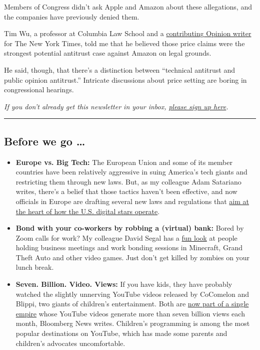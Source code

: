 Members of Congress didn't ask Apple and Amazon about these allegations,
and the companies have previously denied them.

Tim Wu, a professor at Columbia Law School and a
\href{https://www.nytimes3xbfgragh.onion/by/tim-wu}{contributing Opinion
writer} for The New York Times, told me that he believed those price
claims were the strongest potential antitrust case against Amazon on
legal grounds.

He said, though, that there's a distinction between ``technical
antitrust and public opinion antitrust.'' Intricate discussions about
price setting are boring in congressional hearings.

\emph{If you don't already get this newsletter in your inbox,}
\href{https://www.nytimes3xbfgragh.onion/newsletters/signup/OT}{\emph{please
sign up here}}\emph{.}

\begin{center}\rule{0.5\linewidth}{\linethickness}\end{center}

\hypertarget{before-we-go-}{%
\subsection{Before we go \ldots{}}\label{before-we-go-}}

\begin{itemize}
\item
  \textbf{Europe vs. Big Tech:} The European Union and some of its
  member countries have been relatively aggressive in suing America's
  tech giants and restricting them through new laws. But, as my
  colleague Adam Satariano writes, there's a belief that those tactics
  haven't been effective, and now officials in Europe are drafting
  several new laws and regulations that
  \href{https://www.nytimes3xbfgragh.onion/2020/07/30/technology/europe-new-phase-tech-amazon-apple-facebook-google.html}{aim
  at the heart of how the U.S. digital stars operate}.
\item
  \textbf{Bond with your co-workers by robbing a (virtual) bank:} Bored
  by Zoom calls for work? My colleague David Segal has a
  \href{https://www.nytimes3xbfgragh.onion/2020/07/31/business/hey-you-free-on-friday-for-a-meeting-and-a-bank-heist.html}{fun
  look} at people holding business meetings and work bonding sessions in
  Minecraft, Grand Theft Auto and other video games. Just don't get
  killed by zombies on your lunch break.
\item
  \textbf{Seven. Billion. Video. Views:} If you have kids, they have
  probably watched the slightly unnerving YouTube videos released by
  CoComelon and Blippi, two giants of children's entertainment. Both are
  \href{https://www.bloomberg.com/news/articles/2020-07-30/blippi-cocomelon-purchased-by-kids-media-giant-moonbug}{now
  part of a single empire} whose YouTube videos generate more than seven
  billion views each month, Bloomberg News writes. Children's
  programming is among the most popular destinations on YouTube, which
  has made some parents and children's advocates uncomfortable.
\end{itemize}

